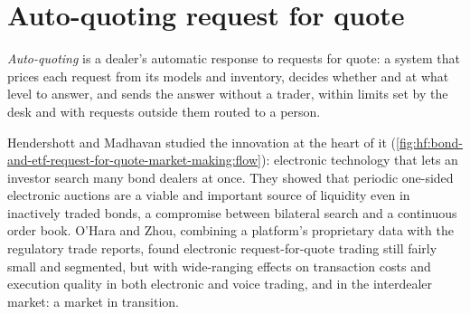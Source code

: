 \section{Auto-quoting request for quote}

\begin{definition}\label{def:hf:bond-and-etf-request-for-quote-market-making:auto}
\emph{Auto-quoting} is a dealer's automatic response to requests for quote: a system that prices each request from its models
and inventory, decides whether and at what level to answer, and sends the answer without a trader, within limits set by the desk and with requests
outside them routed to a person.
\end{definition}

\begin{omfigure}

\label{fig:hf:bond-and-etf-request-for-quote-market-making:flow}
\end{omfigure}

Hendershott and Madhavan studied the innovation at the heart of it (\cref{fig:hf:bond-and-etf-request-for-quote-market-making:flow}): electronic
technology that lets an investor search many bond dealers at once. They showed that periodic one-sided electronic auctions are a viable and
important source of liquidity even in inactively traded bonds, a compromise between bilateral search and a continuous order book. O'Hara and Zhou,
combining a platform's proprietary data with the regulatory trade reports, found electronic request-for-quote trading still fairly small and
segmented, but with wide-ranging effects on transaction costs and execution quality in both electronic and voice trading, and in the interdealer
market: a market in transition.

